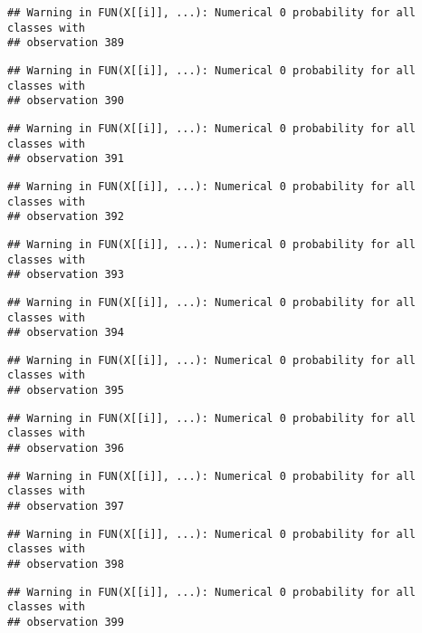 \documentclass[
]{article}
\begin{document}
\begin{verbatim}
## Warning in FUN(X[[i]], ...): Numerical 0 probability for all classes with
## observation 389
\end{verbatim}

\begin{verbatim}
## Warning in FUN(X[[i]], ...): Numerical 0 probability for all classes with
## observation 390
\end{verbatim}

\begin{verbatim}
## Warning in FUN(X[[i]], ...): Numerical 0 probability for all classes with
## observation 391
\end{verbatim}

\begin{verbatim}
## Warning in FUN(X[[i]], ...): Numerical 0 probability for all classes with
## observation 392
\end{verbatim}

\begin{verbatim}
## Warning in FUN(X[[i]], ...): Numerical 0 probability for all classes with
## observation 393
\end{verbatim}

\begin{verbatim}
## Warning in FUN(X[[i]], ...): Numerical 0 probability for all classes with
## observation 394
\end{verbatim}

\begin{verbatim}
## Warning in FUN(X[[i]], ...): Numerical 0 probability for all classes with
## observation 395
\end{verbatim}

\begin{verbatim}
## Warning in FUN(X[[i]], ...): Numerical 0 probability for all classes with
## observation 396
\end{verbatim}

\begin{verbatim}
## Warning in FUN(X[[i]], ...): Numerical 0 probability for all classes with
## observation 397
\end{verbatim}

\begin{verbatim}
## Warning in FUN(X[[i]], ...): Numerical 0 probability for all classes with
## observation 398
\end{verbatim}

\begin{verbatim}
## Warning in FUN(X[[i]], ...): Numerical 0 probability for all classes with
## observation 399
\end{verbatim}
\end{document}
